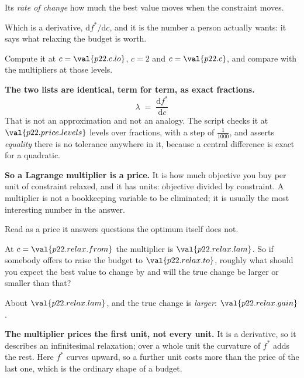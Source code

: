 \begin{fr}
\begin{ansblock}
Its \emph{rate of change} \dash{} how much the best value moves when the
constraint moves.
\end{ansblock}

Which is a derivative, $\mathrm{d}f^{*}/\mathrm{d}c$, and it is the
number a person actually wants: it says what relaxing the budget is worth.

Compute it at $c = \val{p22.c.lo}$, $c = \num{2}$ and $c = \val{p22.c}$, and
compare with the multipliers at those levels.

\end{fr}

\begin{fr}
\begin{note}
\textbf{The two lists are identical, term for term, as exact fractions.}
\[ \lambda \;=\; \frac{\mathrm{d}f^{*}}{\mathrm{d}c} \]
That is not an approximation and not an analogy. The script checks it at
$\val{p22.price.levels}$ levels over fractions, with a step of
$\frac{1}{1000}$, and asserts \emph{equality} \dash{} there is no tolerance
anywhere in it, because a central difference is exact for a quadratic.

\textbf{So a Lagrange multiplier is a price.} It is how much objective you buy
per unit of constraint relaxed, and it has units: objective divided by
constraint. A multiplier is not a bookkeeping variable to be eliminated; it is
usually the most interesting number in the answer.
\end{note}
\end{fr}

\begin{fr}
Read as a price it answers questions the optimum itself does not.

At $c = \val{p22.relax.from}$ the multiplier is $\val{p22.relax.lam}$. So if
somebody offers to raise the budget to $\val{p22.relax.to}$, roughly what
should you expect the best value to change by \dash{} and will the true change
be larger or smaller than that?
\nextframe
\end{fr}

\begin{fr}
\begin{ansblock}
About $\val{p22.relax.lam}$, and the true change is \emph{larger}:
$\val{p22.relax.gain}$.
\end{ansblock}

\textbf{The multiplier prices the first unit, not every unit.} It is a
derivative, so it describes an infinitesimal relaxation; over a whole unit the
curvature of $f^{*}$ adds the rest. Here $f^{*}$ curves upward, so a further
unit costs more than the price of the last one, which is the ordinary shape of
a budget.

\end{fr}

